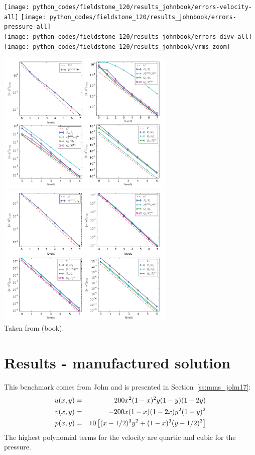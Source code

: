\begin{center}
\texttt{[image: python\_codes/fieldstone\_120/results\_johnbook/errors-velocity-all]}
\texttt{[image: python\_codes/fieldstone\_120/results\_johnbook/errors-pressure-all]}\\
\texttt{[image: python\_codes/fieldstone\_120/results\_johnbook/errors-divv-all]}
\texttt{[image: python\_codes/fieldstone\_120/results\_johnbook/vrms\_zoom]}
\end{center}


\begin{center} 
\includegraphics[width=8.5cm]{python_codes/fieldstone_120/images/john_a}
\includegraphics[width=8.5cm]{python_codes/fieldstone_120/images/john_b}\\
{\captionfont Taken from \textcite{john16} (book).}
\end{center} 

\newpage
\section*{Results - \textcite{jolm17} manufactured solution}

This benchmark comes from John \etal \cite{jolm17} and is presented in Section~\ref{ss:mms_jolm17}:
\begin{eqnarray}
u(x,y) &=& 200x^2(1-x)^2y(1-y)(1-2y) \nonumber\\
v(x,y) &=& -200x(1-x)(1-2x)y^2(1-y)^2 \nonumber\\
p(x,y) &=& 10\left[(x-1/2)^3y^2+(1-x)^3(y-1/2)^3 \right] \nonumber
\end{eqnarray}
The highest polynomial terms for the velocity are quartic and cubic for the pressure.


